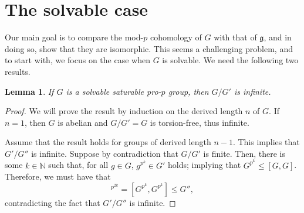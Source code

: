 \documentclass[11pt]{article}
\newcommand{\N}{\mathbb{N}}
\newcommand{\g}{\mathfrak{g}}
\theoremstyle{plain}
\newtheorem{lemma}{Lemma}[section]
\theoremstyle{definition}
\begin{document}
	
	
	
	\section{The solvable case}\label{sec: solvable}

	Our main goal is to compare the mod-$p$ cohomology of $G$ with that of $\g$, and in doing so, show that they are isomorphic. This seems a challenging problem, and to start with, we focus on the case when $G$ is solvable. We need the following two results. 

	
	
	\begin{lemma}\label{lem: abelianisation infinite}
		If $G$ is a solvable saturable pro-$p$ group, then $G/G'$ is infinite.
	\end{lemma}
	
	
	\begin{proof}
		We will prove the result by induction on the derived length $n$ of $G$. If $n=1$, then $G$ is abelian and $G/G'=G$ is torsion-free, thus infinite.
		
		Assume that the result holds for groups of derived length $n-1$. This implies that $G'/G''$ is infinite. Suppose by contradiction that $G/G'$ is finite. Then, there is some $k\in \N$ such that, for all $g\in G$, $g^{p^k}\in G'$ holds; implying that $G^{p^k}\leq [G,G]$. Therefore, we must have that
		\begin{displaymath}
			[G,G]^{p^{2k}}=[G^{p^k},G^{p^k}]\leq G'',
		\end{displaymath}
		contradicting the fact that $G'/G''$ is infinite.
	\end{proof}

	
	
\end{document}
